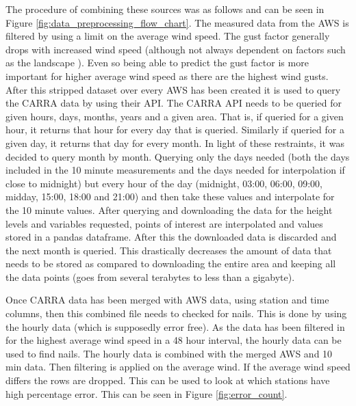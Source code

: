 The procedure of combining these sources was as follows and can be seen in Figure \ref{fig:data_preprocessing_flow_chart}. The measured data from the AWS is filtered by using a limit on the average wind speed. The gust factor generally drops with increased wind speed (although not always dependent on factors such as the landscape \cite{GNP_vidtal}). Even so being able to predict the gust factor is more important for higher average wind speed as there are the highest wind gusts. After this stripped dataset over every AWS has been created it is used to query the CARRA data by using their API. The CARRA API needs to be queried for given hours, days, months, years and a given area. That is, if queried for a given hour, it returns that hour for every day that is queried. Similarly if queried for a given day, it returns that day for every month. In light of these restraints, it was decided to query month by month. Querying only the days needed (both the days included in the 10 minute measurements and the days needed for interpolation if close to midnight) but every hour of the day (midnight, 03:00, 06:00, 09:00, midday, 15:00, 18:00 and 21:00) and then take these values and interpolate for the 10 minute values. After querying and downloading the data for the height levels and variables requested, points of interest are interpolated and values stored in a pandas dataframe. After this the downloaded data is discarded and the next month is queried. This drastically decreases the amount of data that needs to be stored as compared to downloading the entire area and keeping all the data points (goes from several terabytes to less than a gigabyte).

Once CARRA data has been merged with AWS data, using station and time columns, then this combined file needs to checked for nails. This is done by using the hourly data (which is supposedly error free). As the data has been filtered in for the highest average wind speed in a 48 hour interval, the hourly data can be used to find nails. The hourly data is combined with the merged AWS and 10 min data. Then filtering is applied on the average wind. If the average wind speed differs the rows are dropped. This can be used to look at which stations have high percentage error. This can be seen in Figure \ref{fig:error_count}.

